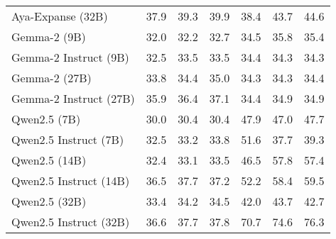 \begin{table*}[h!]
{\begin{tabular}{lcccccc}
Aya-Expanse (32B)                             & 37.9                 & 39.3                 & 39.9                      & 38.4                 & 43.7                 & 44.6                       \\ 
\hdashline
Gemma-2 (9B)                                  & 32.0                & 32.2                 & 32.7                     & 34.5                & 35.8                & 35.4                      \\
Gemma-2 Instruct (9B)                         & 32.5                & 33.5                & 33.5                     & 34.4                & 34.3                & 34.3                      \\
Gemma-2 (27B)                                 & 33.8                 & 34.4                & 35.0                     & 34.3                & 34.3                & 34.4                      \\
Gemma-2 Instruct (27B)                        & 35.9                & 36.4                & 37.1                     & 34.4                & 34.9                & 34.9                      \\ 
\hdashline
Qwen2.5 (7B)                                  & 30.0                   & 30.4                & 30.4                     & 47.9                & 47.0                & 47.7                      \\
Qwen2.5 Instruct (7B)                         & 32.5                & 33.2                & 33.8                     & 51.6                & 37.7                & 39.3                      \\
Qwen2.5 (14B)                                 & 32.4                 & 33.1                 & 33.5                      & 46.5                 & 57.8                 & 57.4                       \\
Qwen2.5 Instruct (14B)                        & 36.5                 & 37.7                 & 37.2                      & 52.2                 & 58.4                 & 59.5                       \\
Qwen2.5 (32B)                                 & 33.4                & 34.2                 & 34.5                     & 42.0                & 43.7                & 42.7                      \\
Qwen2.5 Instruct (32B)                        & 36.6                & 37.7                & 37.8                     & 70.7                & 74.6                & 76.3                      \\

\end{tabular}}
\end{table*}
